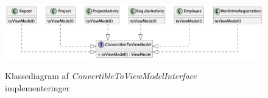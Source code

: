 \begin{figure}[H]
    \centering
    \caption{Klassediagram af \textit{ConvertibleToViewModelInterface} implementeringer}
    \includegraphics[width = \textwidth, keepaspectratio]{TaskFusion/out/assets/diagrams/class_convertibleToViewModel_example/ConvertibleToViewModel_diagram.png}
    \label{fig:class_convertible_example}
\end{figure}

